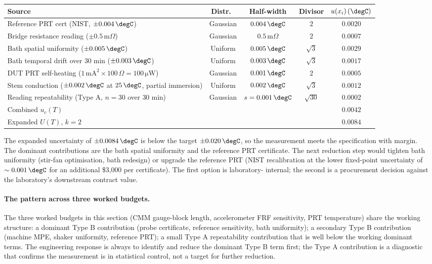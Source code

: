 \begin{center}
\small
\begin{tabular}{lcccc}
\toprule
Source & Distr.\ & Half-width & Divisor & $u(x_{i})\,(\degC)$ \\
\midrule
Reference PRT cert (NIST, $\pm 0.004\,\degC$) & Gaussian & $0.004\,\degC$ & $2$ & $0.0020$ \\
Bridge resistance reading ($\pm 0.5\,\text{m}\Omega$) & Gaussian & $0.5\,\text{m}\Omega$ & $2$ & $0.0007$ \\
Bath spatial uniformity ($\pm 0.005\,\degC$) & Uniform & $0.005\,\degC$ & $\sqrt{3}$ & $0.0029$ \\
Bath temporal drift over 30 min ($\pm 0.003\,\degC$) & Uniform & $0.003\,\degC$ & $\sqrt{3}$ & $0.0017$ \\
DUT PRT self-heating ($1\,\text{m}\text{A}^{2} \times 100\,\Omega = 100\,\si{\micro\watt}$) & Gaussian & $0.001\,\degC$ & $2$ & $0.0005$ \\
Stem conduction ($\pm 0.002\,\degC$ at $25\,\degC$, partial immersion) & Uniform & $0.002\,\degC$ & $\sqrt{3}$ & $0.0012$ \\
Reading repeatability (Type A, $n = 30$ over $30$ min) & Gaussian & $s = 0.001\,\degC$ & $\sqrt{30}$ & $0.0002$ \\
\midrule
Combined $u_{c}(T)$ & & & & $0.0042$ \\
Expanded $U(T)$, $k = 2$ & & & & $0.0084$ \\
\bottomrule
\end{tabular}
\end{center}

The expanded uncertainty of $\pm 0.0084\,\degC$ is below the
target $\pm 0.020\,\degC$, so the measurement meets the
specification with margin. The dominant contributions are
the bath spatial uniformity and the reference PRT certificate.
The next reduction step would tighten bath uniformity
(stir-fan optimisation, bath redesign) or upgrade the
reference PRT (NIST recalibration at the lower fixed-point
uncertainty of $\sim 0.001\,\degC$ for an additional
\$3{,}000 per certificate). The first option is laboratory-
internal; the second is a procurement decision against the
laboratory's downstream contract value.

\paragraph{The pattern across three worked budgets.} The three
worked budgets in this section (CMM gauge-block length,
accelerometer FRF sensitivity, PRT temperature) share the
working structure: a dominant Type B contribution (probe
certificate, reference sensitivity, bath uniformity); a
secondary Type B contribution (machine MPE, shaker uniformity,
reference PRT); a small Type A repeatability contribution
that is well below the working dominant terms. The
engineering response is always to identify and reduce the
dominant Type B term first; the Type A contribution is a
diagnostic that confirms the measurement is in statistical
control, not a target for further reduction.

